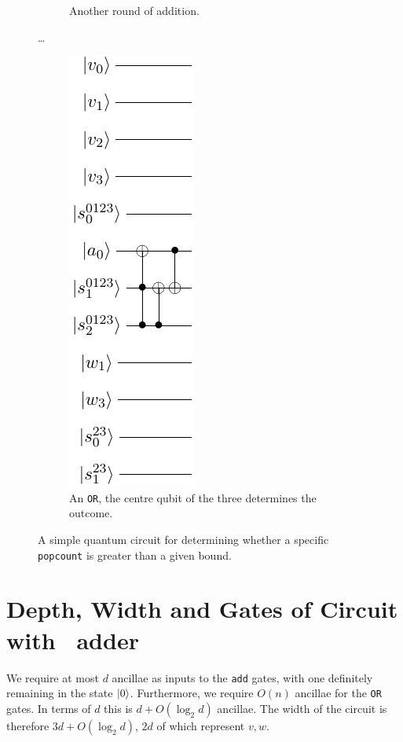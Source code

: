 \documentclass[notitlepage]{article}
\theoremstyle{definition}
\begin{document}
\begin{figure}
\begin{subfigure}{.3\textwidth}
        \caption{Another round of addition.}\label{subfig:naive_popcnt2}
    \end{subfigure}
    \dots
    \begin{subfigure}{.3\textwidth}
        \centering
        \includegraphics{popcnt_sieve_pt3}
        \caption{An \texttt{OR}, the centre qubit of the three determines the outcome.}\label{subfig:naive_popcnt3}
    \end{subfigure}
    \caption{A simple quantum circuit for determining whether a specific \texttt{popcount} is greater than a given bound.}\label{fig:naive_popcnt}
\end{figure}

\section*{Depth, Width and Gates of Circuit with~\cite{cuccaro2004new} adder}

We require at most $d$ ancillae as inputs to the \texttt{add} gates, with one definitely remaining in the state $\ket{0}$.
Furthermore, we require $O(n)$ ancillae for the \texttt{OR} gates.
In terms of $d$ this is $d + O(\log_{2}d)$ ancillae. The width of the circuit is therefore $3d + O(\log_{2}d)$, $2d$ of which represent $v, w$.
\end{document}
